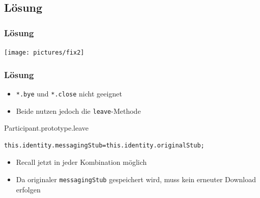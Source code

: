 \documentclass{beamer}
\begin{document}
\subsection{Lösung}
\begin{frame}
	\frametitle{Lösung}
	\texttt{[image: pictures/fix2]}
\end{frame}


\begin{frame}[fragile]
	\frametitle{Lösung}
	\begin{itemize}
		\item \texttt{*.bye} und \texttt{*.close} nicht geeignet
		\item Beide nutzen jedoch die \texttt{leave}-Methode
	\end{itemize}
	
	\begin{exampleblock}{Participant.prototype.leave}
		\begin{lstlisting}[linewidth=1.0\textwidth=small]
		this.identity.messagingStub=this.identity.originalStub;
		\end{lstlisting}
	\end{exampleblock}
	
	\begin{itemize}
		\item Recall jetzt in jeder Kombination möglich
		\item Da originaler \texttt{messagingStub} gespeichert wird, muss kein erneuter Download erfolgen
	\end{itemize}
\end{frame}
\end{document}
